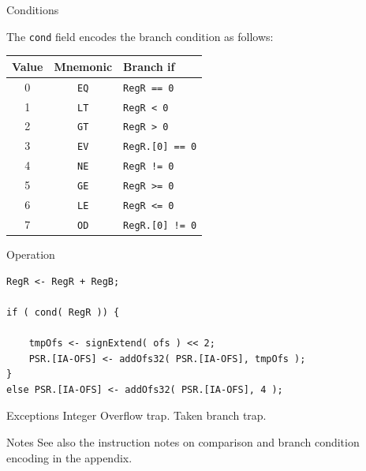 \begin{iPageDescEntry}{Conditions}

The \texttt{cond} field encodes the branch condition as follows:

\begin{flushleft}
\begin{tabular}{|c|c|l|}
\hline
\textbf{Value} & \textbf{Mnemonic} & \textbf{Branch if} \\ \hline
0 & \texttt{EQ} & \texttt{RegR == 0} \\ \hline
1 & \texttt{LT} & \texttt{RegR <  0}  \\ \hline
2 & \texttt{GT} & \texttt{RegR >  0} \\ \hline
3 & \texttt{EV} & \texttt{RegR.[0] == 0} \\ \hline
4 & \texttt{NE} & \texttt{RegR != 0} \\ \hline
5 & \texttt{GE} & \texttt{RegR >= 0} \\ \hline
6 & \texttt{LE} & \texttt{RegR <= 0}  \\ \hline
7 & \texttt{OD} & \texttt{RegR.[0] != 0} \\ \hline
\end{tabular}
\end{flushleft}

\end{iPageDescEntry}

\begin{iPageDescOpEntry}{Operation}
\begin{lstlisting}[style=iPageOpStyle]
RegR <- RegR + RegB;

if ( cond( RegR )) {

    tmpOfs <- signExtend( ofs ) << 2;
    PSR.[IA-OFS] <- addOfs32( PSR.[IA-OFS], tmpOfs );
}
else PSR.[IA-OFS] <- addOfs32( PSR.[IA-OFS], 4 );
\end{lstlisting}
\end{iPageDescOpEntry}

\begin{iPageDescEntry}{Exceptions}
	Integer Overflow trap.
	Taken branch trap.
\end{iPageDescEntry}

\begin{iPageDescEntry}{Notes}
See also the instruction notes on comparison and branch condition encoding in the appendix.
\end{iPageDescEntry}
